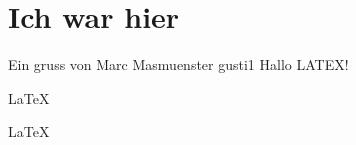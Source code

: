 \documentclass{article}
\begin{document}
\section{Ich war hier}
Ein gruss von Marc Masmuenster gusti1
Hallo LATEX!  

\LaTeX 

\huge
\LaTeX 
   
\end{document}
